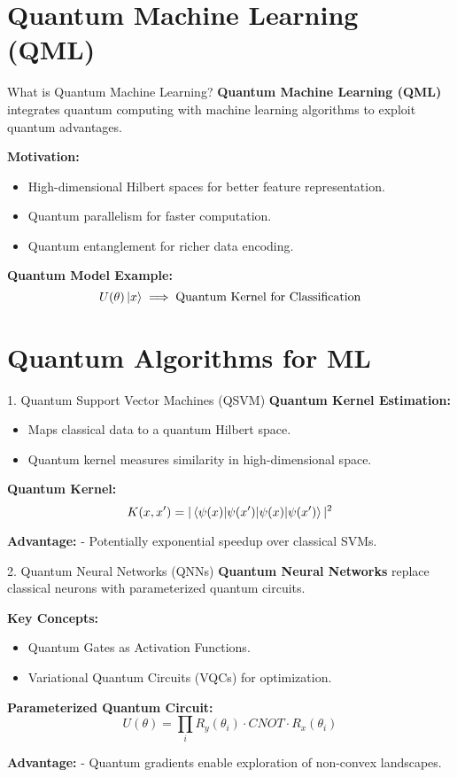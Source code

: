 \documentclass{beamer}
\begin{document}
\section{Quantum Machine Learning (QML)}
\begin{frame}{What is Quantum Machine Learning?}
\textbf{Quantum Machine Learning (QML)} integrates quantum computing with machine learning algorithms to exploit quantum advantages.

\vspace{10pt}
\textbf{Motivation:}
\begin{itemize}
    \item High-dimensional Hilbert spaces for better feature representation.
    \item Quantum parallelism for faster computation.
    \item Quantum entanglement for richer data encoding.
\end{itemize}

\pause
\textbf{Quantum Model Example:}
\[
U(\theta)\ket{x} \implies \text{Quantum Kernel for Classification}
\]
\end{frame}

\section{Quantum Algorithms for ML}
\begin{frame}{1. Quantum Support Vector Machines (QSVM)}
\textbf{Quantum Kernel Estimation:}
\begin{itemize}
    \item Maps classical data to a quantum Hilbert space.
    \item Quantum kernel measures similarity in high-dimensional space.
\end{itemize}

\pause
\textbf{Quantum Kernel:}
\[
K(x, x') = |\braket{\psi(x) | \psi(x')}|^2
\]

\textbf{Advantage:}
- Potentially exponential speedup over classical SVMs.
\end{frame}

\begin{frame}{2. Quantum Neural Networks (QNNs)}
\textbf{Quantum Neural Networks} replace classical neurons with parameterized quantum circuits.

\textbf{Key Concepts:}
\begin{itemize}
    \item Quantum Gates as Activation Functions.
    \item Variational Quantum Circuits (VQCs) for optimization.
\end{itemize}

\pause
\textbf{Parameterized Quantum Circuit:}
\[
U(\theta) = \prod_i R_y(\theta_i) \cdot CNOT \cdot R_x(\theta_i)
\]

\textbf{Advantage:}
- Quantum gradients enable exploration of non-convex landscapes.
\end{frame}
\end{document}
